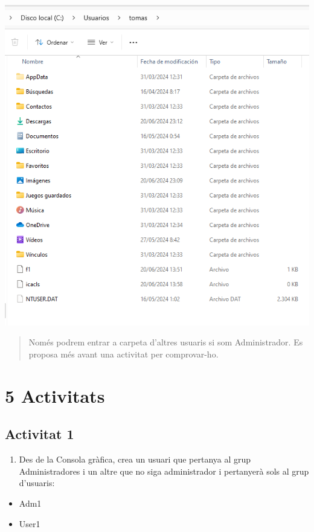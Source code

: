 \documentclass[
  a4paper,
]{article}
\providecommand{\tightlist}{%
  \setlength{\itemsep}{0pt}\setlength{\parskip}{0pt}}
\begin{document}
\includegraphics{png/CarpetesPerfil.png}

\begin{quote}
Només podrem entrar a carpeta d'altres usuaris si som Administrador. Es
proposa més avant una activitat per comprovar-ho.
\end{quote}

\newpage

\section{5 Activitats}\label{activitats}

\subsection{Activitat 1}\label{activitat-1}

\begin{enumerate}
\def\labelenumi{\arabic{enumi}.}
\tightlist
\item
  Des de la Consola gràfica, crea un usuari que pertanya al grup
  Administradores i un altre que no siga administrador i pertanyerà sols
  al grup d'usuaris:
\end{enumerate}

\begin{itemize}
\tightlist
\item
  Adm1
\item
  User1
\end{itemize}
\end{document}
